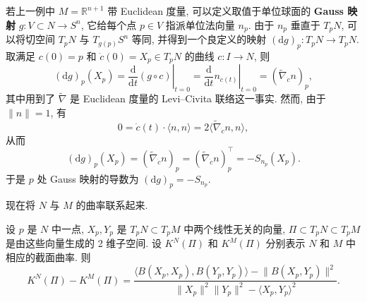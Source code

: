 \begin{RiemannExample}\label{ex:derivative-of-gauss-map}
若上一例中 $M=\mathbb{R}^{n+1}$ 带 Euclidean 度量, 可以定义取值于单位球面的 \textbf{Gauss 映射} $g:V\subset N\to S^n$, 它给每个点 $p\in V$ 指派单位法向量 $n_p$. 由于 $n_p$ 垂直于 $T_pN$, 可以将切空间 $T_pN$ 与 $T_{g(p)}S^n$ 等同, 并得到一个良定义的映射 $(\mathrm{d}g)_p:T_pN\to T_pN$. 取满足 $c(0)=p$ 和 $\dot c(0)=X_p\in T_pN$ 的曲线 $c:I\to N$, 则
\[
  (\mathrm{d}g)_p(X_p)=\left.\frac{\mathrm{d}}{\mathrm{d}t}(g\circ c)\right|_{t=0}
  =\left.\frac{\mathrm{d}}{\mathrm{d}t}n_{c(t)}\right|_{t=0}
  =(\widetilde\nabla_{\dot c}n)_p,
\]
其中用到了 $\widetilde\nabla$ 是 Euclidean 度量的 Levi–Civita 联络这一事实. 然而, 由于 $\lVert n\rVert=1$, 有
\[
  0=\dot c(t)\cdot\langle n,n\rangle=2\langle\widetilde\nabla_{\dot c}n,n\rangle,
\]
从而
\[
  (\mathrm{d}g)_p(X_p)=(\widetilde\nabla_{\dot c}n)_p
    =(\widetilde\nabla_{\dot c}n)_p^\top=-S_{n_p}(X_p).
\]
于是 $p$ 处 Gauss 映射的导数为 $(\mathrm{d}g)_p=-S_{n_p}$.
\end{RiemannExample}

现在将 $N$ 与 $M$ 的曲率联系起来.

\begin{RiemannProposition}\label{prop:sectional-curvature-of-isometrically-immersed-submanifold}
设 $p$ 是 $N$ 中一点, $X_p,Y_p$ 是 $T_pN\subset T_pM$ 中两个线性无关的向量, $\Pi\subset T_pN\subset T_pM$ 是由这些向量生成的 2 维子空间. 设 $K^N(\Pi)$ 和 $K^M(\Pi)$ 分别表示 $N$ 和 $M$ 中相应的截面曲率. 则
\[
  K^N(\Pi)-K^M(\Pi)=
  \frac{\langle B(X_p,X_p),B(Y_p,Y_p)\rangle-\lVert B(X_p,Y_p)\rVert^2}
       {\lVert X_p\rVert^2\lVert Y_p\rVert^2-\langle X_p,Y_p\rangle^2}.
\]
\end{RiemannProposition}

